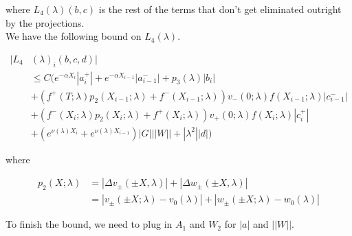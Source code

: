 \documentclass[12pt]{article}
\begin{document}
\begin{enumerate}
where $L_4(\lambda)(b, c)$ is the rest of the terms that don't get eliminated outright by the projections.\\

We have the following bound on $L_4(\lambda)$. 

\begin{align*}
|L_4&(\lambda)_i(b, c, d)|\\ 
&\leq C \Big( e^{-\alpha X_i} |a_i^+| +  e^{-\alpha X_{i-1}} |a_{i-1}^-| + p_3(\lambda) |b_i| \\
&+ (f^+(T; \lambda) p_2(X_{i-1}; \lambda) + f^-(X_{i-1}; \lambda)) v_-(0; \lambda)  f(X_{i-1}; \lambda) |c_{i-1}^-| \\
&+ (f^-(X_i; \lambda) p_2(X_i; \lambda) + f^+(X_i; \lambda)) v_+(0; \lambda) f(X_i; \lambda)  |c_i^+| \\
&+ (e^{\nu(\lambda)X_i} + e^{\nu(\lambda)X_{i-1}}) |G| ||W|| + |\lambda^2| |d| \Big)
\end{align*}

where

\begin{align*}
p_2(X; \lambda) &= |\Delta v_\pm(\pm X, \lambda)| + |\Delta w_\pm(\pm X, \lambda)|\\
&= |v_\pm(\pm X; \lambda) - v_0(\lambda)| + |w_\pm(\pm X; \lambda) - w_0(\lambda)|
\end{align*}

To finish the bound, we need to plug in $A_1$ and $W_2$ for $|a|$ and $||W||$.


\end{enumerate}
\end{document}
